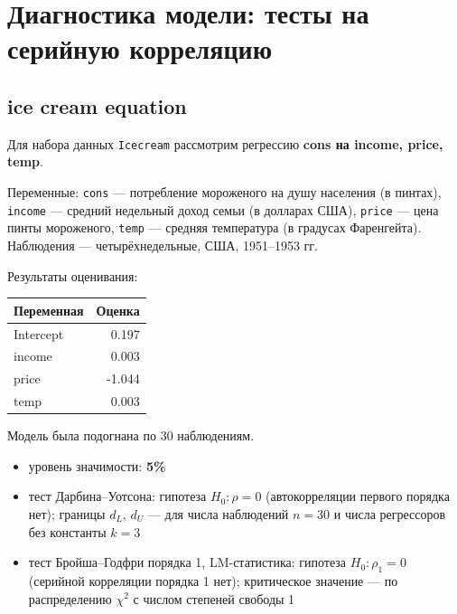\documentclass[
  russian,
]{article}
\newcounter{none} %
\providecommand{\tightlist}{%
  \setlength{\itemsep}{0pt}\setlength{\parskip}{0pt}}
\begin{document}
\section{Диагностика модели: тесты на серийную
корреляцию}\label{ux434ux438ux430ux433ux43dux43eux441ux442ux438ux43aux430-ux43cux43eux434ux435ux43bux438-ux442ux435ux441ux442ux44b-ux43dux430-ux441ux435ux440ux438ux439ux43dux443ux44e-ux43aux43eux440ux440ux435ux43bux44fux446ux438ux44e}

\subsection{ice cream equation}\label{ice-cream-equation}

Для набора данных \texttt{Icecream} рассмотрим регрессию \textbf{cons на
income, price, temp}.

Переменные: \texttt{cons} --- потребление мороженого на душу населения
(в пинтах), \texttt{income} --- средний недельный доход семьи (в
долларах США), \texttt{price} --- цена пинты мороженого, \texttt{temp}
--- средняя температура (в градусах Фаренгейта). Наблюдения ---
четырёхнедельные, США, 1951--1953 гг.

Результаты оценивания:

{\def\LTcaptype{none} %
\begin{longtable}[]{@{}lr@{}}
\toprule\noalign{}
Переменная & Оценка \\
\midrule\noalign{}
\endhead
\bottomrule\noalign{}
\endlastfoot
Intercept & 0.197 \\
income & 0.003 \\
price & -1.044 \\
temp & 0.003 \\
\end{longtable}
}

Модель была подогнана по 30 наблюдениям.

\begin{tcolorbox}[enhanced jigsaw, arc=.35mm, bottomrule=.15mm, bottomtitle=1mm, breakable, colback=white, colbacktitle=quarto-callout-important-color!10!white, colframe=quarto-callout-important-color-frame, coltitle=black, left=2mm, leftrule=.75mm, opacityback=0, opacitybacktitle=0.6, rightrule=.15mm, title=\textcolor{quarto-callout-important-color}{\faExclamation}\hspace{0.5em}{Условия теста}, titlerule=0mm, toprule=.15mm, toptitle=1mm]

\begin{itemize}
\tightlist
\item
  уровень значимости: \textbf{5\%}
\item
  тест Дарбина--Уотсона: гипотеза \(H_0:\rho=0\) (автокорреляции первого
  порядка нет); границы \(d_L\), \(d_U\) --- для числа наблюдений
  \(n=30\) и числа регрессоров без константы \(k=3\)
\item
  тест Бройша--Годфри порядка 1, LM-статистика: гипотеза
  \(H_0:\rho_1=0\) (серийной корреляции порядка 1 нет); критическое
  значение --- по распределению \(\chi^2\) с числом степеней свободы 1
\end{itemize}

\end{tcolorbox}
\end{document}
